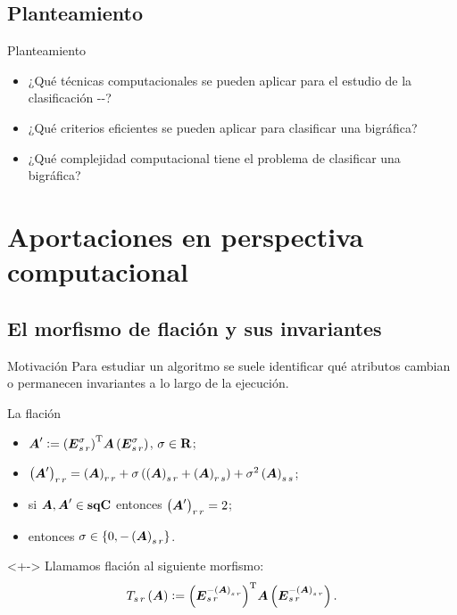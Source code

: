 \documentclass[spanish]{beamer}
\begin{document}
\subsection{Planteamiento}
\begin{frame}{Planteamiento}
  \begin{itemize}[<+->]
    \item ¿Qué \alert{técnicas computacionales} se pueden aplicar para el 
    estudio de la clasificación \DynA-\DynD-\DynE?
    \item ¿Qué \alert{criterios eficientes} se pueden aplicar para clasificar 
    una bigráfica?
    \item ¿Qué \alert{complejidad computacional} tiene el problema de 
    clasificar una bigráfica?
  \end{itemize}
\end{frame}

\section{Aportaciones en perspectiva computacional}

\subsection{El morfismo de flación y sus invariantes}
\begin{frame}{Motivación}
    Para estudiar un algoritmo se suele identificar qué atributos cambian o 
    permanecen invariantes a lo largo de la ejecución.
\end{frame}

\begin{frame}{La flación}
  \begin{itemize}[<+->]
    \item $\boldsymbol{A}^\prime \mathrel{\mathop:}= 
    {\left(\boldsymbol{E}_{{s} \, {r}}^{\sigma}\right)}^{\operatorname{T}} \boldsymbol{A} 
    \left(\boldsymbol{E}_{{s} \, {r}}^{\sigma}\right)$, $\sigma \in \mathbf{R}$;
    \item $\left({\boldsymbol{A}^\prime}\right)_{{r}\,{r}} = \left({\boldsymbol{A}}\right)_{{r}\,{r}} + \sigma 
    \left(\left({\boldsymbol{A}}\right)_{{s}\,{r}} + \left({\boldsymbol{A}}\right)_{{r}\,{s}}\right) + 
    \sigma^2\left({\boldsymbol{A}}\right)_{{s}\,{s}}$;
    \item si $\boldsymbol{A}, \boldsymbol{A}^\prime \in \mathbf{sqC}$ entonces 
    $\left({\boldsymbol{A}^\prime}\right)_{{r}\,{r}} = 2$;
    \item entonces $\sigma \in \left\{{0, -\left({\boldsymbol{A}}\right)_{{s}\,{r}}}\right\}$.
  \end{itemize}
  \begin{definition}<+->
    Llamamos \alert{flación} al siguiente morfismo:
    \begin{equation*}
      T_{{{s}}\,{{r}}}\left({\boldsymbol{A}}\right) \mathrel{\mathop:}= 
      {\left(\boldsymbol{E}_{{s} \, {r}}^{-\left({\boldsymbol{A}}\right)_{{s}\,{r}}}\right)}^{\operatorname{T}} 
      \boldsymbol{A} \left(\boldsymbol{E}_{{s} \, {r}}^{-\left({\boldsymbol{A}}\right)_{{s}\,{r}}}\right)\text{.}
    \end{equation*}
  \end{definition}
\end{frame}
\end{document}
